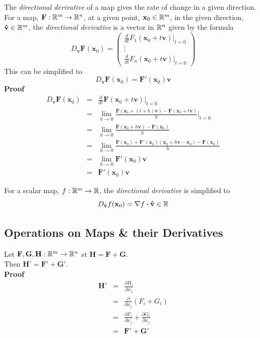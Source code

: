\documentclass[11pt,a4paper]{article}
\begin{document}
The \textit{directional derivative} of a map gives the rate of change in a given direction.\\
For a map, $\textbf{F} : \mathbb{R}^m \to \mathbb{R}^n$, at a given point, $\textbf{x}_0 \in \mathbb{R}^m$, in the given direction, $\textbf{\^v} \in \mathbb{R}^m$, the \textit{directional derivative} is a vector in $\mathbb{R}^n$ given by the formula
$$D_{\textbf{\^v}}\textbf{F}(\textbf{x}_0) = \begin{pmatrix} \frac{d}{dt} F_1 (\textbf{x}_0 + t \textbf{\^v})|_{t=0} \\ \vdots \\ \frac{d}{dt} F_n (\textbf{x}_0 + t \textbf{\^v})|_{t=0} \end{pmatrix}$$
This can be simplified to
$$D_\textbf{\^v}\textbf{F}(\textbf{x}_0) = \textbf{F}'(\textbf{x}_0)\textbf{\^v}$$
\textbf{Proof}
\[\begin{array}{rcl}
D_{\textbf{\^v}} \textbf{F}(\textbf{x}_0) &=& \frac{d}{dt} \textbf{F} (\textbf{x}_0 + t \textbf{\^v})\big\vert_{t=0}\\
&=& \lim_{h\to 0} \frac{\textbf{F}(\textbf{x}_0 + (t+h)\textbf{\^v}) - \textbf{F}(\textbf{x}_0 + t\textbf{\^v})}{h}\big\vert_{t=0}\\
&=& \lim_{h\to 0} \frac{\textbf{F}(\textbf{x}_0 + h\textbf{\^v}) - \textbf{F}(\textbf{x}_0)}{h}\\
&=& \lim_{h\to 0} \frac{\textbf{F}(\textbf{x}_0) + \textbf{F}'(\textbf{x}_0)(\textbf{x}_0 + h\textbf{\^v} - \textbf{x}_0) - \textbf{F}(\textbf{x}_0)}{h}\\
&=& \lim_{h\to 0} \textbf{F}'(\textbf{x}_0)\textbf{\^v}\\
&=& \textbf{F}'(\textbf{x}_0)\textbf{\^v}
\end{array}\]

For a scalar map, $f : \mathbb{R}^m \to \mathbb{R}$,  the \textit{directional derivative} is simplified to
$$D_\textbf{\^v}f(\textbf{x}_0) = \nabla f \boldsymbol{\cdot} \textbf{\^v} \in \mathbb{R}$$

\subsection{Operations on Maps \& their Derivatives}

Let $\textbf{F}, \textbf{G}, \textbf{H} : \mathbb{R}^m \to \mathbb{R}^n$ st $\textbf{H} = \textbf{F} + \textbf{G}$.\\
Then $\textbf{H}' = \textbf{F}' + \textbf{G}'$.\\
\textbf{Proof}
\[\begin{array}{rcl}
  \textbf{H}' &=& \frac{\partial H_i}{\partial x_j}\\
  &=& \frac{\partial}{\partial x_j} (F_i + G_i)\\
  &=& \frac{\partial F_i}{\partial x_j} + \frac{\partial G_i}{\partial x_j}\\
  &=& \textbf{F}' + \textbf{G}'
\end{array}\]
\end{document}

